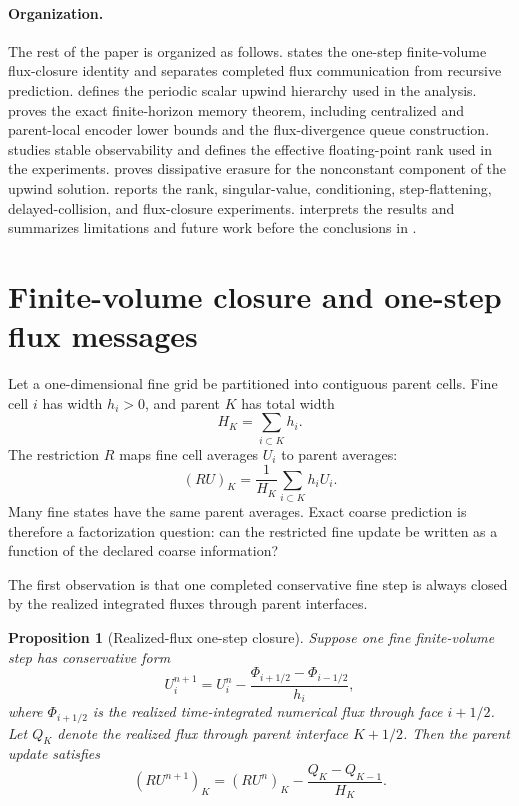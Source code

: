 \documentclass[preprint,12pt]{elsarticle}
\theoremstyle{plain}
\newtheorem{proposition}{Proposition}
\theoremstyle{remark}
\theoremstyle{definition}
\begin{document}
\paragraph{Organization.}
The rest of the paper is organized as follows.  
states the one-step finite-volume flux-closure identity and separates
completed flux communication from recursive prediction.  
defines the periodic scalar upwind hierarchy used in the analysis.
 proves the exact finite-horizon memory theorem, including
centralized and parent-local encoder lower bounds and the flux-divergence
queue construction.   studies stable
observability and defines the effective floating-point rank used in the
experiments.   proves dissipative erasure for the
nonconstant component of the upwind solution.   reports the
rank, singular-value, conditioning, step-flattening, delayed-collision, and
flux-closure experiments.   interprets the results and  summarizes limitations and future work before the
conclusions in .

\section{Finite-volume closure and one-step flux messages} \label{sec:fv_closure}

Let a one-dimensional fine grid be partitioned into contiguous parent cells.
Fine cell \(i\) has width \(h_i>0\), and parent \(K\) has total width
\[
  H_K=\sum_{i\subset K} h_i .
\]
The restriction \(R\) maps fine cell averages \(U_i\) to parent averages:
\[
  (RU)_K =
  \frac{1}{H_K}\sum_{i\subset K} h_i U_i .
\]
Many fine states have the same parent averages.  Exact coarse prediction is
therefore a factorization question: can the restricted fine update be written
as a function of the declared coarse information?

The first observation is that one completed conservative fine step is always
closed by the realized integrated fluxes through parent interfaces.

\begin{proposition}[Realized-flux one-step closure]
\label{prop:flux-closure}
Suppose one fine finite-volume step has conservative form
\[
  U_i^{n+1}
  =
  U_i^n
  -
  \frac{\Phi_{i+1/2}-\Phi_{i-1/2}}{h_i},
\]
where \(\Phi_{i+1/2}\) is the realized time-integrated numerical flux through
face \(i+1/2\).  Let \(Q_K\) denote the realized flux through parent interface
\(K+1/2\).  Then the parent update satisfies
\[
  (RU^{n+1})_K
  =
  (RU^n)_K
  -
  \frac{Q_K-Q_{K-1}}{H_K}.
\]
\end{proposition}
\end{document}
